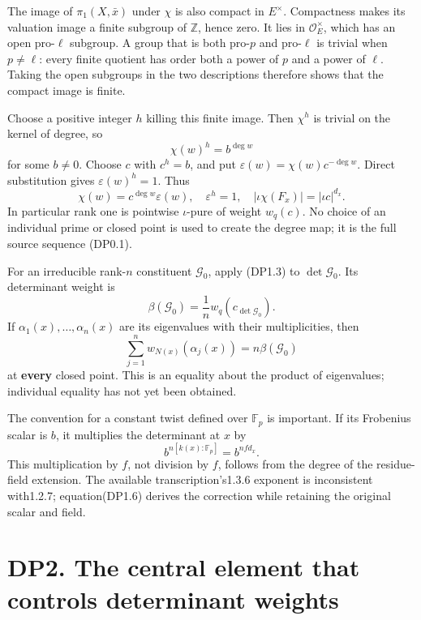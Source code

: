 \documentclass[
]{report}
\begin{document}
The image of \(\pi_1(X,\bar x)\) under \(\chi\) is also compact in
\(E^\times\). Compactness makes its valuation image a finite subgroup of
\(\mathbb Z\), hence zero. It lies in \(\mathcal O_E^\times\), which has
an open pro-\(\ell\) subgroup. A group that is both pro-\(p\) and
pro-\(\ell\) is trivial when \(p\ne\ell\): every finite quotient has
order both a power of \(p\) and a power of \(\ell\). Taking the open
subgroups in the two descriptions therefore shows that the compact image
is finite.

Choose a positive integer \(h\) killing this finite image. Then
\(\chi^h\) is trivial on the kernel of degree, so \[
\chi(w)^h=b^{\deg w}
\tag{DP1.2}
\] for some \(b\ne0\). Choose \(c\) with \(c^h=b\), and put
\(\varepsilon(w)=\chi(w)c^{-\deg w}\). Direct substitution gives
\(\varepsilon(w)^h=1\). Thus \[
\boxed{\chi(w)=c^{\deg w}\varepsilon(w),\quad
\varepsilon^h=1,\quad
|\iota\chi(F_x)|=|\iota c|^{d_x}.}
\tag{DP1.3}
\] In particular rank one is pointwise \(\iota\)-pure of weight
\(w_q(c)\). No choice of an individual prime or closed point is used to
create the degree map; it is the full source sequence (DP0.1).

For an irreducible rank-\(n\) constituent \(\mathcal G_0\), apply
(DP1.3) to \(\det\mathcal G_0\). Its determinant weight is \[
\beta(\mathcal G_0)=\frac1n w_q(c_{\det\mathcal G_0}).
\tag{DP1.4}
\] If \(\alpha_1(x),\ldots,\alpha_n(x)\) are its eigenvalues with their
multiplicities, then \[
\sum_{j=1}^n w_{N(x)}(\alpha_j(x))=n\beta(\mathcal G_0)
\tag{DP1.5}
\] at \textbf{every} closed point. This is an equality about the product
of eigenvalues; individual equality has not yet been obtained.

The convention for a constant twist defined over \(\mathbb F_p\) is
important. If its Frobenius scalar is \(b\), it multiplies the
determinant at \(x\) by \[
b^{n[k(x):\mathbb F_p]}=b^{n f d_x}.
\tag{DP1.6}
\] This multiplication by \(f\), not division by \(f\), follows from the
degree of the residue-field extension. The available
transcription's1.3.6 exponent is inconsistent with1.2.7; equation(DP1.6)
derives the correction while retaining the original scalar and field.

\section{DP2. The central element that controls determinant
weights}\label{dp2.-the-central-element-that-controls-determinant-weights}
\end{document}

